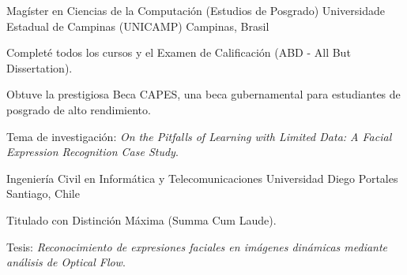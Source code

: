 
\begin{cventries}

\cventry
{Magíster en Ciencias de la Computación (Estudios de Posgrado)} %
{Universidade Estadual de Campinas (UNICAMP)} %
{Campinas, Brasil} %
{} %
{
\begin{cvitems} %
\item {Completé todos los cursos y el Examen de Calificación (ABD - All But Dissertation).}
\item {Obtuve la prestigiosa Beca CAPES, una beca gubernamental para estudiantes de posgrado de alto rendimiento.}
\item {Tema de investigación: \emph{On the Pitfalls of Learning with Limited Data: A Facial Expression Recognition Case Study}.}
\end{cvitems}
}

\cventry
{Ingeniería Civil en Informática y Telecomunicaciones} %
{Universidad Diego Portales} %
{Santiago, Chile} %
{} %
{
\begin{cvitems} %
\item {Titulado con Distinción Máxima (Summa Cum Laude).}
\item {Tesis: \emph{Reconocimiento de expresiones faciales en imágenes dinámicas mediante análisis de Optical Flow}.}
\end{cvitems}
}

\end{cventries}
